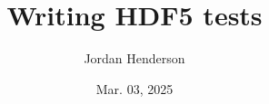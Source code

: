 \documentclass[letterpaper,rfc,hyper]{HDF5_RFC}
\title{Writing HDF5 tests}
\author{Jordan Henderson}
\date{Mar. 03, 2025}
\begin{document}
\maketitle



\newpage
\tableofcontents

\newpage










\makerevisions




\appendix




\end{document}
